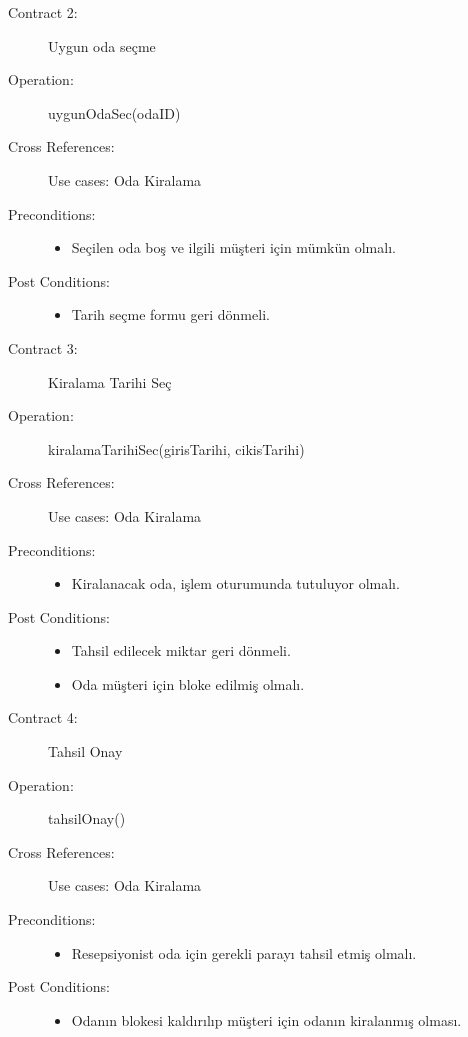 \documentclass[12pt,a4paper]{report}
\begin{document}
\begin{description}
\item[Contract 2:] Uygun oda seçme
\item[Operation:] uygunOdaSec(odaID)
\item[Cross References:] Use cases: Oda Kiralama
\item[Preconditions:] \hspace{10 mm}
\begin{itemize}
\item Seçilen oda boş ve ilgili müşteri için mümkün olmalı.
\end{itemize}
\item[Post Conditions:] \hspace{10 mm}
\begin{itemize} 
\item Tarih seçme formu geri dönmeli. \\
\end{itemize}
\end{description}

\begin{description}
\item[Contract 3:] Kiralama Tarihi Seç
\item[Operation:] kiralamaTarihiSec(girisTarihi, cikisTarihi)
\item[Cross References:] Use cases: Oda Kiralama
\item[Preconditions:] \hspace{10 mm}
\begin{itemize}
\item Kiralanacak oda, işlem oturumunda tutuluyor olmalı.
\end{itemize}
\item[Post Conditions:] \hspace{10 mm}
\begin{itemize} 
\item Tahsil edilecek miktar geri dönmeli.
\item Oda müşteri için bloke edilmiş olmalı. \\
\end{itemize}
\end{description}

\begin{description}
\item[Contract 4:] Tahsil Onay
\item[Operation:] tahsilOnay()
\item[Cross References:] Use cases: Oda Kiralama
\item[Preconditions:] \hspace{10 mm}
\begin{itemize}
\item Resepsiyonist oda için gerekli parayı tahsil etmiş olmalı.
\end{itemize}
\item[Post Conditions:] \hspace{10 mm}
\begin{itemize} 
\item Odanın blokesi kaldırılıp müşteri için odanın kiralanmış olması. \\
\end{itemize}
\end{description}
\end{document}
